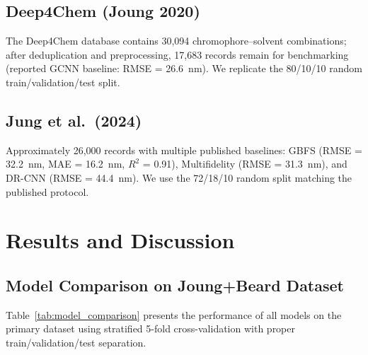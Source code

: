 \subsection{Deep4Chem (Joung 2020)}
The Deep4Chem database contains 30,094 chromophore--solvent combinations\cite{joung2021deep}; after deduplication and preprocessing, 17,683 records remain for benchmarking (reported GCNN baseline: RMSE = 26.6~nm).
We replicate the 80/10/10 random train/validation/test split.

\subsection{Jung et al.\ (2024)}
Approximately 26,000 records with multiple published baselines\cite{jung2024machine}: GBFS (RMSE = 32.2~nm, MAE = 16.2~nm, $R^2$ = 0.91), Multifidelity (RMSE = 31.3~nm), and DR-CNN (RMSE = 44.4~nm).
We use the 72/18/10 random split matching the published protocol.


\section{Results and Discussion}
\label{sec:results}

\subsection{Model Comparison on Joung+Beard Dataset}
\label{sec:model_comparison}

Table~\ref{tab:model_comparison} presents the performance of all models on the primary dataset using stratified 5-fold cross-validation with proper train/validation/test separation.

